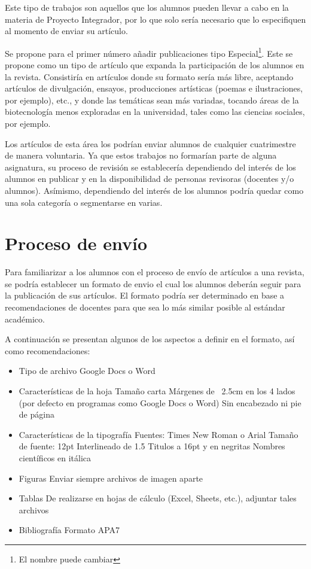 Este tipo de trabajos son aquellos que los alumnos pueden llevar a cabo en la materia de Proyecto Integrador, por lo que solo sería necesario que lo especifiquen al momento de enviar su artículo.

Se propone para el primer número añadir publicaciones tipo Especial\footnote{El nombre puede cambiar}. Este se propone como un tipo de artículo que expanda la participación de los alumnos en la revista. Consistiría en artículos donde su formato sería más libre, aceptando artículos de divulgación, ensayos, producciones artísticas (poemas e ilustraciones, por ejemplo), etc., y donde las temáticas sean más variadas, tocando áreas de la biotecnología menos exploradas en la universidad, tales como las ciencias sociales, por ejemplo.

Los artículos de esta área los podrían enviar alumnos de cualquier cuatrimestre de manera voluntaria. Ya que estos trabajos no formarían parte de alguna asignatura, su proceso de revisión se establecería dependiendo del interés de los alumnos en publicar y en la disponibilidad de personas revisoras (docentes y/o alumnos). Asímismo, dependiendo del interés de los alumnos podría quedar como una sola categoría o segmentarse en varias.

\section{Proceso de envío}

Para familiarizar a los alumnos con el proceso de envío de artículos a una revista, se podría establecer un formato de envio el cual los alumnos deberán seguir para la publicación de sus artículos. El formato podría ser determinado en base a recomendaciones de docentes para que sea lo más similar posible al estándar académico.

A continuación se presentan algunos de los aspectos a definir en el formato, así como recomendaciones:

\begin{itemize}
    \item Tipo de archivo
        \subitem Google Docs o Word
    \item Características de la hoja
        \subitem Tamaño carta
        \subitem Márgenes de ~2.5cm en los 4 lados (por defecto en programas como Google Docs o Word)
        \subitem Sin encabezado ni pie de página
    \item Características de la tipografía
        \subitem Fuentes: Times New Roman o Arial
        \subitem Tamaño de fuente: 12pt
        \subitem Interlineado de 1.5
        \subitem Titulos a 16pt y en negritas
        \subitem Nombres científicos en itálica
    \item Figuras
        \subitem Enviar siempre archivos de imagen aparte
    \item Tablas
        \subitem De realizarse en hojas de cálculo (Excel, Sheets, etc.), adjuntar tales archivos
    \item Bibliografía
        \subitem Formato APA7
\end{itemize}


